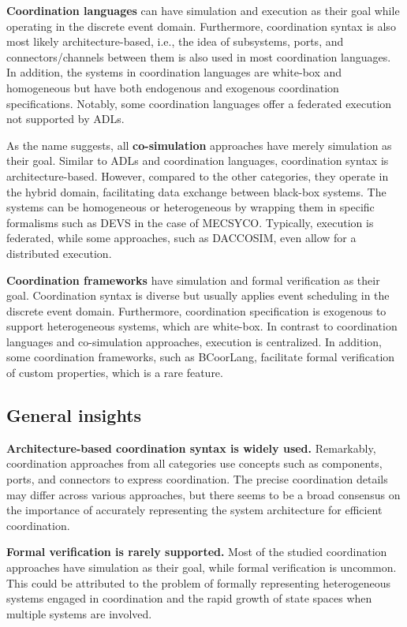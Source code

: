 \documentclass[runningheads]{llncs}
\begin{document}
\textbf{Coordination languages} can have simulation and execution as their goal while operating in the discrete event domain.
Furthermore, coordination syntax is also most likely architecture-based, i.e., the idea of subsystems, ports, and connectors/channels between them is also used in most coordination languages.
In addition, the systems in coordination languages are white-box and homogeneous but have both endogenous and exogenous coordination specifications.
Notably, some coordination languages offer a federated execution not supported by ADLs.

As the name suggests, all \textbf{co-simulation} approaches have merely simulation as their goal.
Similar to ADLs and coordination languages, coordination syntax is architecture-based.
However, compared to the other categories, they operate in the hybrid domain, facilitating data exchange between black-box systems.
The systems can be homogeneous or heterogeneous by wrapping them in specific formalisms such as DEVS in the case of MECSYCO.
Typically, execution is federated, while some approaches, such as DACCOSIM, even allow for a distributed execution.

\textbf{Coordination frameworks} have simulation and formal verification as their goal.
Coordination syntax is diverse but usually applies event scheduling in the discrete event domain.
Furthermore, coordination specification is exogenous to support heterogeneous systems, which are white-box.
In contrast to coordination languages and co-simulation approaches, execution is centralized.
In addition, some coordination frameworks, such as BCoorLang, facilitate formal verification of custom properties, which is a rare feature.

\subsection{General insights}

\textbf{Architecture-based coordination syntax is widely used.}
Remarkably, coordination approaches from all categories use concepts such as components, ports, and connectors to express coordination.
The precise coordination details may differ across various approaches, but there seems to be a broad consensus on the importance of accurately representing the system architecture for efficient coordination.

\textbf{Formal verification is rarely supported.}
Most of the studied coordination approaches have simulation as their goal, while formal verification is uncommon.
This could be attributed to the problem of formally representing heterogeneous systems engaged in coordination and the rapid growth of state spaces when multiple systems are involved.
\end{document}
